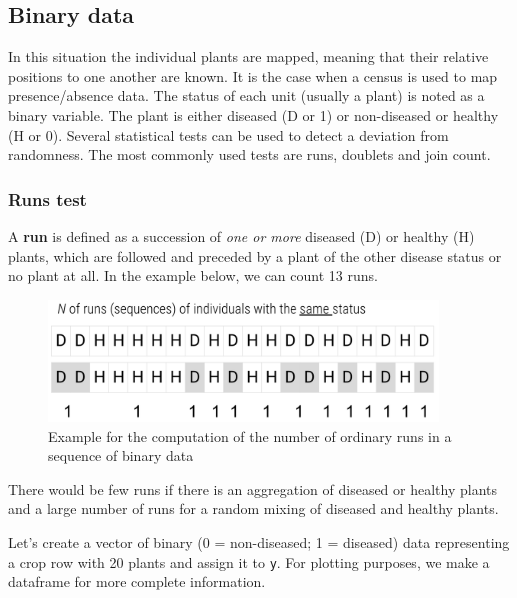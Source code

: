 \documentclass[
  letterpaper,
]{book}
\begin{document}
\hypertarget{binary-data}{%
\subsection{Binary data}\label{binary-data}}

In this situation the individual plants are mapped, meaning that their
relative positions to one another are known. It is the case when a
census is used to map presence/absence data. The status of each unit
(usually a plant) is noted as a binary variable. The plant is either
diseased (D or 1) or non-diseased or healthy (H or 0). Several
statistical tests can be used to detect a deviation from randomness. The
most commonly used tests are runs, doublets and join count.

\hypertarget{runs-test}{%
\subsubsection{Runs test}\label{runs-test}}

A \textbf{run} is defined as a succession of \emph{one or more} diseased
(D) or healthy (H) plants, which are followed and preceded by a plant of
the other disease status or no plant at all. In the example below, we
can count 13 runs.

\begin{figure}

{\centering \includegraphics[width=4.07292in,height=\textheight]{imgs/runs.png}

}

\caption{\label{fig-runs1}Example for the computation of the number of
ordinary runs in a sequence of binary data}

\end{figure}

There would be few runs if there is an aggregation of diseased or
healthy plants and a large number of runs for a random mixing of
diseased and healthy plants.

Let's create a vector of binary (0 = non-diseased; 1 = diseased) data
representing a crop row with 20 plants and assign it to \texttt{y}. For
plotting purposes, we make a dataframe for more complete information.
\end{document}

